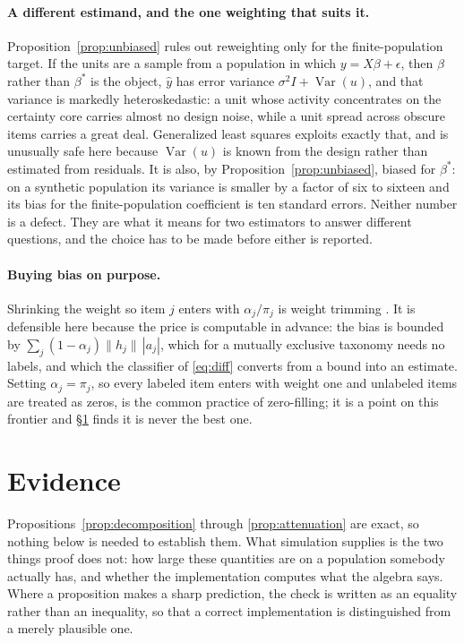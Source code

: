 \documentclass[11pt]{article}
\newcommand{\Var}{\operatorname{Var}}
\theoremstyle{plain}
\theoremstyle{remark}
\begin{document}
\paragraph{A different estimand, and the one weighting that suits it.} Proposition~\ref{prop:unbiased} rules out reweighting only for the finite-population target. If the units are a sample from a population in which $y=X\beta+\epsilon$, then $\beta$ rather than $\beta^*$ is the object, $\widehat y$ has error variance $\sigma^2I+\Var(u)$, and that variance is markedly heteroskedastic: a unit whose activity concentrates on the certainty core carries almost no design noise, while a unit spread across obscure items carries a great deal. Generalized least squares exploits exactly that, and is unusually safe here because $\Var(u)$ is known from the design rather than estimated from residuals. It is also, by Proposition~\ref{prop:unbiased}, biased for $\beta^*$: on a synthetic population its variance is smaller by a factor of six to sixteen and its bias for the finite-population coefficient is ten standard errors. Neither number is a defect. They are what it means for two estimators to answer different questions, and the choice has to be made before either is reported.

\paragraph{Buying bias on purpose.} Shrinking the weight so item $j$ enters with $\alpha_j/\pi_j$ is weight trimming \citep{Potter1990,Beaumont2013}. It is defensible here because the price is computable in advance: the bias is bounded by $\sum_j(1-\alpha_j)\|h_j\|\,|a_j|$, which for a mutually exclusive taxonomy needs no labels, and which the classifier of \eqref{eq:diff} converts from a bound into an estimate. Setting $\alpha_j=\pi_j$, so every labeled item enters with weight one and unlabeled items are treated as zeros, is the common practice of zero-filling; it is a point on this frontier and \S\ref{sec:evidence} finds it is never the best one.

\section{Evidence}
\label{sec:evidence}

Propositions~\ref{prop:decomposition} through \ref{prop:attenuation} are exact, so nothing below is needed to establish them. What simulation supplies is the two things proof does not: how large these quantities are on a population somebody actually has, and whether the implementation computes what the algebra says. Where a proposition makes a sharp prediction, the check is written as an equality rather than an inequality, so that a correct implementation is distinguished from a merely plausible one.
\end{document}
